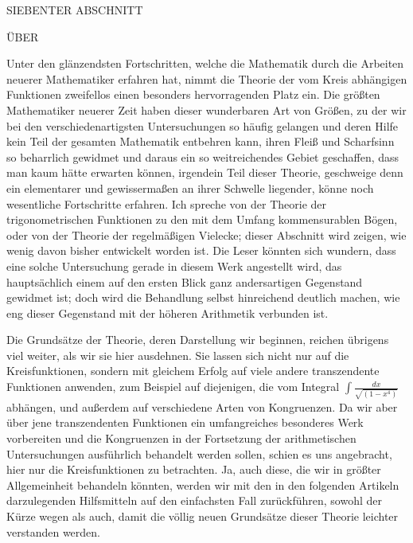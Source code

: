

\begin{center}{\Large SIEBENTER ABSCHNITT}\par\medskip ÜBER\par{}\end{center}

Unter den glänzendsten Fortschritten, welche die Mathematik durch die Arbeiten neuerer Mathematiker erfahren hat, nimmt die Theorie der vom Kreis abhängigen Funktionen zweifellos einen besonders hervorragenden Platz ein. Die größten Mathematiker neuerer Zeit haben dieser wunderbaren Art von Größen, zu der wir bei den verschiedenartigsten Untersuchungen so häufig gelangen und deren Hilfe kein Teil der gesamten Mathematik entbehren kann, ihren Fleiß und Scharfsinn so beharrlich gewidmet und daraus ein so weitreichendes Gebiet geschaffen, dass man kaum hätte erwarten können, irgendein Teil dieser Theorie, geschweige denn ein elementarer und gewissermaßen an ihrer Schwelle liegender, könne noch wesentliche Fortschritte erfahren. Ich spreche von der Theorie der trigonometrischen Funktionen zu den mit dem Umfang kommensurablen Bögen, oder von der Theorie der regelmäßigen Vielecke; dieser Abschnitt wird zeigen, wie wenig davon bisher entwickelt worden ist. Die Leser könnten sich wundern, dass eine solche Untersuchung gerade in diesem Werk angestellt wird, das hauptsächlich einem auf den ersten Blick ganz andersartigen Gegenstand gewidmet ist; doch wird die Behandlung selbst hinreichend deutlich machen, wie eng dieser Gegenstand mit der höheren Arithmetik verbunden ist.

Die Grundsätze der Theorie, deren Darstellung wir beginnen, reichen übrigens viel weiter, als wir sie hier ausdehnen. Sie lassen sich nicht nur auf die Kreisfunktionen, sondern mit gleichem
Erfolg auf viele andere transzendente Funktionen anwenden, zum Beispiel auf diejenigen, die vom Integral \(\int\frac{dx}{\surd{(1-x^4)}}\) abhängen, und außerdem auf verschiedene Arten von Kongruenzen. Da wir aber über jene transzendenten Funktionen ein umfangreiches besonderes Werk vorbereiten und die Kongruenzen in der Fortsetzung der arithmetischen Untersuchungen ausführlich behandelt werden sollen, schien es uns angebracht, hier nur die Kreisfunktionen zu betrachten. Ja, auch diese, die wir in größter Allgemeinheit behandeln könnten, werden wir mit den in den folgenden Artikeln darzulegenden Hilfsmitteln auf den einfachsten Fall zurückführen, sowohl der Kürze wegen als auch, damit die völlig neuen Grundsätze dieser Theorie leichter verstanden werden.

